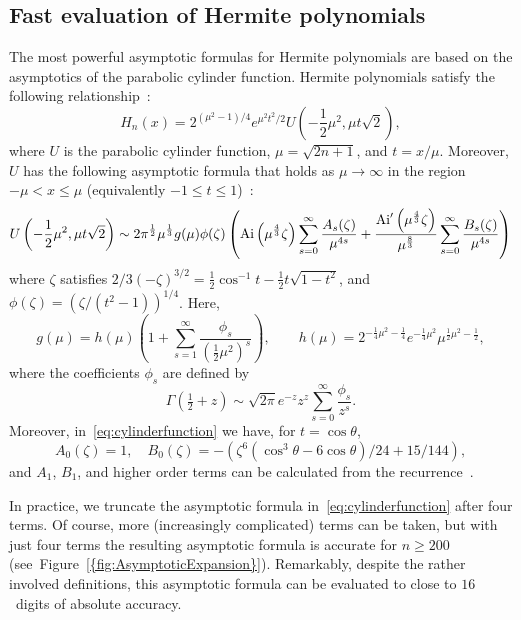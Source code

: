 \documentclass[final]{siamltex}
\begin{document}
\subsection{Fast evaluation of Hermite polynomials}\label{sec:fastHermiteEvaluation} 
The most powerful asymptotic formulas for Hermite polynomials are based on the asymptotics of the parabolic cylinder function.  
Hermite polynomials satisfy the following relationship~\cite[(18.15.28)]{NISTHandbook}:
\[
H_n(x) = 2^{(\mu^2-1)/4} e^{\mu^2t^2/2} U\left(-\frac{1}{2}\mu^2,\mu t \sqrt{2}\right),
\]
where $U$ is the parabolic cylinder function, $\mu = \sqrt{2n+1}$, and $t = x/\mu$.
Moreover, $U$ has the following asymptotic formula that holds as $\mu\rightarrow\infty$ in the region $-\mu<x\leq\mu$ (equivalently $-1\leq t\leq 1$)~\cite[(12.10.35)]{NISTHandbook}:  
\begin{equation}
U\left(-\frac{1}{2}\mu^2,\mu t\sqrt{2}\right) \sim 2\pi^{\frac{1}{2}} \mu^{\frac{1}{3}} g(\mu) \phi(\zeta)\left({\rm Ai}\left(\mu^{\frac{4}{3}}\zeta\right)\sum_{s=0}^\infty \frac{A_s(\zeta)}{\mu^{4s}} + \frac{{\rm Ai}'\left(\mu^{\frac{4}{3}}\zeta\right)}{\mu^{\frac{8}{3}}}\sum_{s=0}^\infty \frac{B_s(\zeta)}{\mu^{4s}}\right)
\label{eq:cylinderfunction}
\end{equation}
where $\zeta$ satisfies $2/3(-\zeta)^{3/2}=\tfrac{1}{2}\cos^{-1}t - \tfrac{1}{2}t\sqrt{1-t^2}$, and $\phi(\zeta) = (\zeta/(t^2-1))^{1/4}$. Here, 
\[
 g(\mu) = h(\mu) \left(1 + \sum_{s=1}^{\infty} \frac{\phi_s}{(\tfrac{1}{2}\mu^2)^s}\right), \qquad h(\mu) = 2^{-\tfrac{1}{4}\mu^2-\tfrac{1}{4}}e^{-\tfrac{1}{4}\mu^2}\mu^{\tfrac{1}{2}\mu^2-\tfrac{1}{2}}, 
\]
where the coefficients $\phi_s$ are defined by 
\[
 \Gamma(\tfrac{1}{2} + z) \sim \sqrt{2\pi}e^{-z} z^z \sum_{s=0}^\infty \frac{\phi_s}{z^s}.
\]
Moreover, in~\eqref{eq:cylinderfunction} we have, for $t = \cos\theta$,
\[
 A_0(\zeta) = 1, \quad B_0(\zeta) = -(\zeta^6(\cos^3 \theta-6\cos \theta)/24 + 15/144),
\]
and $A_1$, $B_1$, and higher order terms can be calculated from the recurrence~\cite[(12.10.42)]{NISTHandbook}.

In practice, we truncate the asymptotic formula in~\eqref{eq:cylinderfunction} after four terms. Of course, 
more (increasingly complicated) terms can be taken, but with just four terms the resulting asymptotic formula is 
accurate for $n\geq 200$ (see~{Figure~\ref{{fig:AsymptoticExpansion}}}).  Remarkably, despite the rather involved definitions, this asymptotic formula can be evaluated 
to close to $16$~digits of absolute accuracy. 
\end{document}
